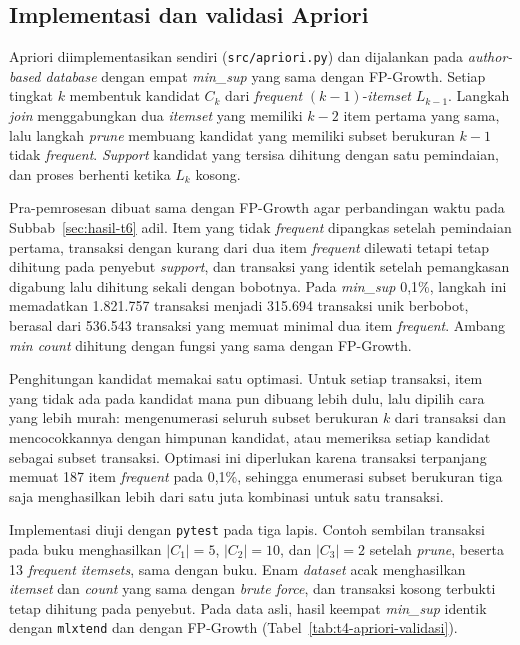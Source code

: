 \subsection{Implementasi dan validasi Apriori}
\label{sec:hasil-t4-apriori}
Apriori \cite{agrawal1994} diimplementasikan sendiri (\texttt{src/apriori.py}) dan dijalankan pada \textit{author-based database} dengan empat \textit{min\_sup} yang sama dengan FP-Growth. Setiap tingkat $k$ membentuk kandidat $C_k$ dari \textit{frequent} $(k-1)$-\textit{itemset} $L_{k-1}$. Langkah \textit{join} menggabungkan dua \textit{itemset} yang memiliki $k-2$ item pertama yang sama, lalu langkah \textit{prune} membuang kandidat yang memiliki subset berukuran $k-1$ tidak \textit{frequent}. \textit{Support} kandidat yang tersisa dihitung dengan satu pemindaian, dan proses berhenti ketika $L_k$ kosong.

Pra-pemrosesan dibuat sama dengan FP-Growth agar perbandingan waktu pada Subbab~\ref{sec:hasil-t6} adil. Item yang tidak \textit{frequent} dipangkas setelah pemindaian pertama, transaksi dengan kurang dari dua item \textit{frequent} dilewati tetapi tetap dihitung pada penyebut \textit{support}, dan transaksi yang identik setelah pemangkasan digabung lalu dihitung sekali dengan bobotnya. Pada \textit{min\_sup} 0,1\%, langkah ini memadatkan 1.821.757 transaksi menjadi 315.694 transaksi unik berbobot, berasal dari 536.543 transaksi yang memuat minimal dua item \textit{frequent}. Ambang \textit{min count} dihitung dengan fungsi yang sama dengan FP-Growth.

Penghitungan kandidat memakai satu optimasi. Untuk setiap transaksi, item yang tidak ada pada kandidat mana pun dibuang lebih dulu, lalu dipilih cara yang lebih murah: mengenumerasi seluruh subset berukuran $k$ dari transaksi dan mencocokkannya dengan himpunan kandidat, atau memeriksa setiap kandidat sebagai subset transaksi. Optimasi ini diperlukan karena transaksi terpanjang memuat 187 item \textit{frequent} pada 0,1\%, sehingga enumerasi subset berukuran tiga saja menghasilkan lebih dari satu juta kombinasi untuk satu transaksi.

Implementasi diuji dengan \texttt{pytest} pada tiga lapis. Contoh sembilan transaksi pada buku \textcite{han2012} menghasilkan $|C_1| = 5$, $|C_2| = 10$, dan $|C_3| = 2$ setelah \textit{prune}, beserta 13 \textit{frequent itemsets}, sama dengan buku. Enam \textit{dataset} acak menghasilkan \textit{itemset} dan \textit{count} yang sama dengan \textit{brute force}, dan transaksi kosong terbukti tetap dihitung pada penyebut. Pada data asli, hasil keempat \textit{min\_sup} identik dengan \texttt{mlxtend} dan dengan FP-Growth (Tabel~\ref{tab:t4-apriori-validasi}).

